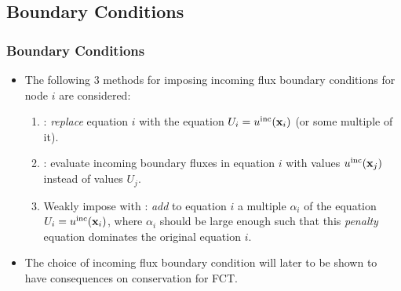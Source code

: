 \subsection{Boundary Conditions}
\begin{frame}
\frametitle{Boundary Conditions}

\begin{itemize}
  \item The following 3 methods for imposing incoming flux boundary conditions
    for node $i$ are considered:
    \begin{enumerate}
      \item {}: \emph{replace} equation $i$ with the equation
        $U_i = u^{\textup{inc}}(\mathbf{x}_i)$ (or some multiple of it).
      \item {}: evaluate incoming boundary fluxes 
        in equation $i$ with values $u^{\textup{inc}}(\mathbf{x}_j)$ instead of values $U_j$.
      \item Weakly impose with : \emph{add} to
        equation $i$ a multiple $\alpha_i$ of the equation $U_i = u^{\textup{inc}}(\mathbf{x}_i)$,
        where $\alpha_i$ should be large enough such that this \emph{penalty}
        equation dominates the original equation $i$.
    \end{enumerate}
  \item The choice of incoming flux boundary condition will later to
    be shown to have consequences on conservation for FCT.
\end{itemize}

\end{frame}
